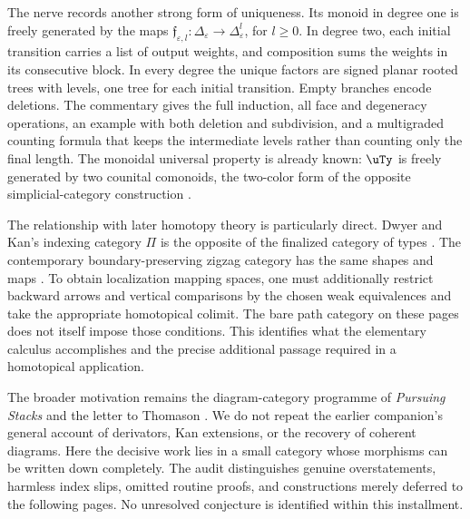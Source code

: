The nerve records another strong form of uniqueness. Its monoid in degree one is freely generated by the maps $\mathfrak f_{\varepsilon,l}:\Delta_\varepsilon\to\Delta_\varepsilon^l$, for $l\geq0$. In degree two, each initial transition carries a list of output weights, and composition sums the weights in its consecutive block. In every degree the unique factors are signed planar rooted trees with levels, one tree for each initial transition. Empty branches encode deletions. The commentary gives the full induction, all face and degeneracy operations, an example with both deletion and subdivision, and a multigraded counting formula that keeps the intermediate levels rather than counting only the final length. The monoidal universal property is already known: $\uTy$ is freely generated by two counital comonoids, the two-color form of the opposite simplicial-category construction \citep[VII.5--6]{MacLane1998}.

The relationship with later homotopy theory is particularly direct. Dwyer and Kan's indexing category $\Pi$ is the opposite of the finalized category of types \citep[\S4.1]{DwyerKan1980Calculating}. The contemporary boundary-preserving zigzag category has the same shapes and maps \citep[Definition~1.1 and Remark~1.3]{ArakawaCnossen2026}. To obtain localization mapping spaces, one must additionally restrict backward arrows and vertical comparisons by the chosen weak equivalences and take the appropriate homotopical colimit. The bare path category on these pages does not itself impose those conditions. This identifies what the elementary calculus accomplishes and the precise additional passage required in a homotopical application.

The broader motivation remains the diagram-category programme of \emph{Pursuing Stacks} and the letter to Thomason \citep{Grothendieck1983,Grothendieck1991Letter}. We do not repeat the earlier companion's general account of derivators, Kan extensions, or the recovery of coherent diagrams. Here the decisive work lies in a small category whose morphisms can be written down completely. The audit distinguishes genuine overstatements, harmless index slips, omitted routine proofs, and constructions merely deferred to the following pages. No unresolved conjecture is identified within this installment.
\endgroup
